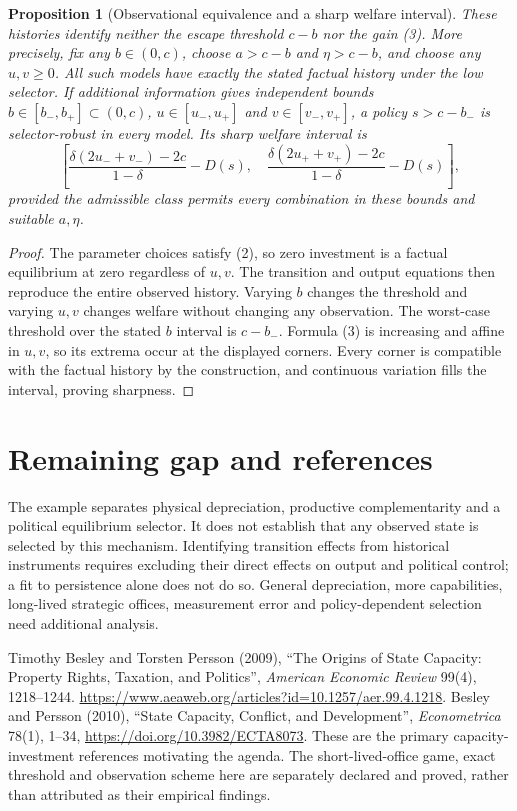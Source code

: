\documentclass[11pt,a4paper]{article}
\newtheorem{proposition}[theorem]{Proposition}
\theoremstyle{definition}
\theoremstyle{remark}
\begin{document}
\begin{proposition}[Observational equivalence and a sharp welfare interval]
These histories identify neither the escape threshold $c-b$ nor the gain (3). More precisely, fix any $b\in(0,c)$, choose $a>c-b$ and $\eta>c-b$, and choose any $u,v\geq0$. All such models have exactly the stated factual history under the low selector. If additional information gives independent bounds $b\in[b_-,b_+]\subset(0,c)$, $u\in[u_-,u_+]$ and $v\in[v_-,v_+]$, a policy $s>c-b_-$ is selector-robust in every model. Its sharp welfare interval is
\[
 \left[\frac{\delta(2u_-+v_-)-2c}{1-\delta}-D(s),\quad
       \frac{\delta(2u_++v_+)-2c}{1-\delta}-D(s)\right],
\]
provided the admissible class permits every combination in these bounds and suitable $a,\eta$.
\end{proposition}
\begin{proof}
The parameter choices satisfy (2), so zero investment is a factual equilibrium at zero regardless of $u,v$. The transition and output equations then reproduce the entire observed history. Varying $b$ changes the threshold and varying $u,v$ changes welfare without changing any observation. The worst-case threshold over the stated $b$ interval is $c-b_-$. Formula (3) is increasing and affine in $u,v$, so its extrema occur at the displayed corners. Every corner is compatible with the factual history by the construction, and continuous variation fills the interval, proving sharpness.
\end{proof}

\section{Remaining gap and references}
The example separates physical depreciation, productive complementarity and a political equilibrium selector. It does not establish that any observed state is selected by this mechanism. Identifying transition effects from historical instruments requires excluding their direct effects on output and political control; a fit to persistence alone does not do so. General depreciation, more capabilities, long-lived strategic offices, measurement error and policy-dependent selection need additional analysis.

Timothy Besley and Torsten Persson (2009), ``The Origins of State Capacity: Property Rights, Taxation, and Politics'', \emph{American Economic Review} 99(4), 1218--1244. \url{https://www.aeaweb.org/articles?id=10.1257/aer.99.4.1218}. Besley and Persson (2010), ``State Capacity, Conflict, and Development'', \emph{Econometrica} 78(1), 1--34, \url{https://doi.org/10.3982/ECTA8073}. These are the primary capacity-investment references motivating the agenda. The short-lived-office game, exact threshold and observation scheme here are separately declared and proved, rather than attributed as their empirical findings.
\end{document}
